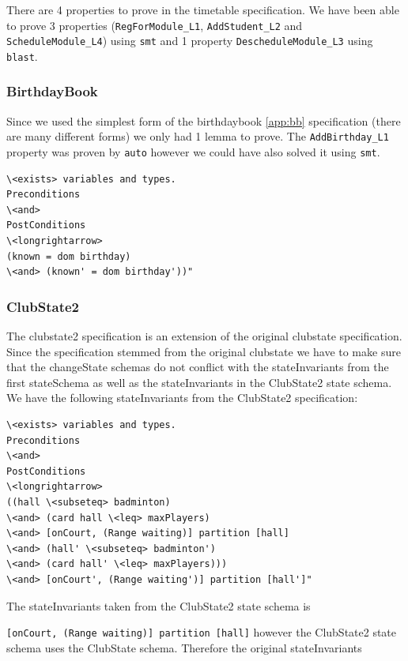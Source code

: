 There are 4 properties to prove in the timetable specification. We have been
able to prove 3 properties (\verb|RegForModule_L1|, \verb|AddStudent_L2| and
\verb|ScheduleModule_L4|) using \verb|smt| and 1 property
\verb|DescheduleModule_L3| using \verb|blast|.

\subsubsection{BirthdayBook}

Since we used the simplest form of the birthdaybook \ref{app:bb} specification (there are
many different forms) we only had 1 lemma to prove. The \verb|AddBirthday_L1|
property was proven by \verb|auto| however we could have also solved it using
\verb|smt|.

\begin{verbatim}
\<exists> variables and types.
Preconditions
\<and>
PostConditions
\<longrightarrow>
(known = dom birthday)
\<and> (known' = dom birthday'))"
\end{verbatim}

\subsubsection{ClubState2}

The clubstate2 specification \cite{mathlangexamples} is an extension of the original clubstate
specification. Since the specification stemmed from the original clubstate we
have to make sure that the changeState schemas do not conflict with the
stateInvariants from the first stateSchema as well as the stateInvariants in the
ClubState2 state schema. We have the following stateInvariants from the
ClubState2 specification:

\begin{verbatim}
\<exists> variables and types.
Preconditions
\<and>
PostConditions
\<longrightarrow>
((hall \<subseteq> badminton)
\<and> (card hall \<leq> maxPlayers)
\<and> [onCourt, (Range waiting)] partition [hall]
\<and> (hall' \<subseteq> badminton')
\<and> (card hall' \<leq> maxPlayers)))
\<and> [onCourt', (Range waiting')] partition [hall']"
\end{verbatim}

The stateInvariants taken from the ClubState2 state schema is

 \verb|[onCourt, (Range waiting)] partition [hall]| however the ClubState2 state
 schema uses the ClubState schema. Therefore the original stateInvariants

